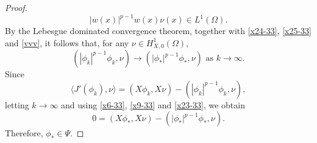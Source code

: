 \documentclass[10pt,a4paper]{amsart}
\begin{document}
\begin{proof}
\begin{equation}
|w(x)|^{p-1}w(x)\nu(x)\in L^1(\Omega).
\end{equation}
By the Lebesgue dominated convergence theorem, together with \eqref{x24-33}, \eqref{x25-33} and \eqref{vvv}, it follows that, for any $\nu\in H_{X,0}^1(\Omega)$,
\begin{equation}\label{x23-33}
\left(|\phi_k|^{p-1}\phi_k,\nu\right)\rightarrow\left(|\phi_*|^{p-1}\phi_*,\nu\right) \mbox{  as  } k\rightarrow\infty.
\end{equation}
Since
\begin{equation*}
\langle J'(\phi_k),\nu\rangle=(X\phi_k,X\nu)-\left(|\phi_k|^{p-1}\phi_k,\nu\right),
\end{equation*}
letting $k\rightarrow \infty$ and using \eqref{x6-33}, \eqref{x9-33} and \eqref{x23-33}, we obtain
\begin{equation*}
0=(X\phi_*,X\nu)-\left(|\phi_*|^{p-1}\phi_*,\nu\right).
\end{equation*}
Therefore, $\phi_*\in \Psi$.
\end{proof}
\end{document}
